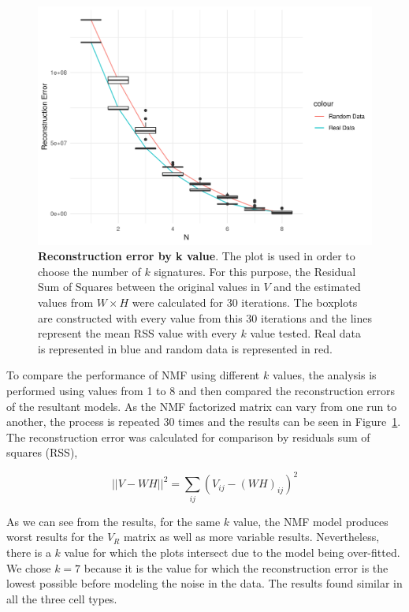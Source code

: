 \begin{figure}[h]
    \centering
    \includegraphics[width=0.7\linewidth]{Figures/select_n/error_by_n.png}
    \caption[Reconstruction error by k value]{\textbf{Reconstruction error by k value}. The plot is used in order to choose the number of \(k\) signatures. For this purpose, the Residual Sum of Squares between the original values in \(V\) and the estimated values from \(W \times H\) were calculated for 30 iterations. The boxplots are constructed with every value from this 30 iterations and the lines represent the mean RSS value with every \(k\) value tested. Real data is represented in blue and random data is represented in red.}
    \label{fig:chooseK_error}
\end{figure}

\medskip

To compare the performance of NMF using different \(k\) values, the analysis is performed using values from 1 to 8 and then compared the reconstruction errors of the resultant models. As the NMF factorized matrix can vary from one run to another, the process is repeated 30 times and the results can be seen in Figure~\ref{fig:chooseK_error}. The reconstruction error was calculated for comparison by residuals sum of squares (RSS),

\begin{equation}
    \vert \vert V - WH \vert \vert ^ 2 = \sum_{ij} (V_{ij} - (WH)_{ij} )^2
\end{equation}

\medskip

As we can see from the results, for the same \(k\) value, the NMF model produces worst results for the \(V_R\) matrix as well as more variable results. Nevertheless, there is a \(k\) value for which the plots intersect due to the model being over-fitted. We chose \(k = 7\) because it is the value for which the reconstruction error is the lowest possible before modeling the noise in the data. The results found similar in all the three cell types.

